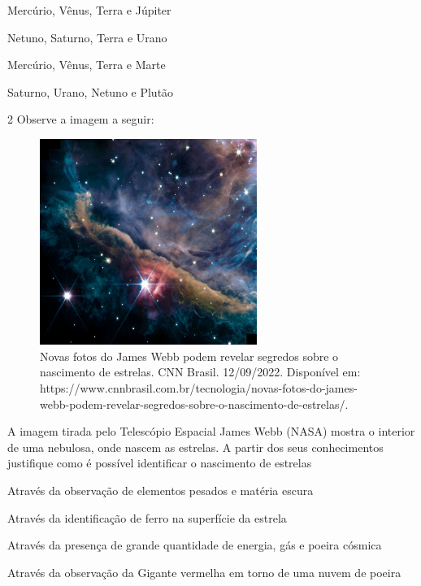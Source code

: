 {{\begin{escolha}
\item
  Mercúrio, Vênus, Terra e Júpiter
\item
  Netuno, Saturno, Terra e Urano
\item
  Mercúrio, Vênus, Terra e Marte
\item
  Saturno, Urano, Netuno e Plutão
\end{escolha}


\num{2} Observe a imagem a seguir:

\begin{figure}[htpb!]
\includegraphics[width=2.77865in,height=2.63750in]{./imgs/img13.jpg}
\caption{Novas fotos do James Webb podem revelar segredos sobre o nascimento de estrelas. CNN Brasil. 12/09/2022. Disponível em: https://www.cnnbrasil.com.br/tecnologia/novas-fotos-do-james-webb-podem-revelar-segredos-sobre-o-nascimento-de-estrelas/.}
\end{figure}

A imagem tirada pelo Telescópio Espacial James Webb (NASA) mostra o
interior de uma nebulosa, onde nascem as estrelas. A partir dos seus
conhecimentos justifique como é possível identificar o nascimento de
estrelas

\begin{escolha}
\item
  Através da observação de elementos pesados e matéria escura
\item
  Através da identificação de ferro na superfície da estrela
\item
  Através da presença de grande quantidade de energia, gás e poeira
  cósmica
\item
  Através da observação da Gigante vermelha em torno de uma nuvem de
  poeira
\end{escolha}

}}
